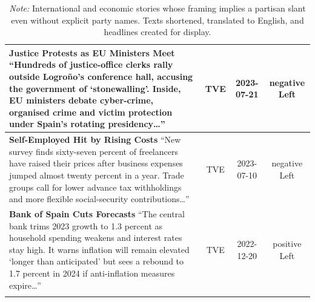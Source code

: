 \documentclass[12pt]{article}
\begin{document}
\begin{center}
\begin{longtable}{|p{8cm}|c|c|c|}
	\textbf{Justice Protests as EU Ministers Meet}\newline
	{\scriptsize“Hundreds of justice-office clerks rally outside Logroño’s conference hall, accusing the government of ‘stonewalling’.  Inside, EU ministers debate cyber-crime, organised crime and victim protection under Spain’s rotating presidency…”}
	& TVE & 2023-07-21 & negative Left\\
	\hline
	
	\textbf{Self-Employed Hit by Rising Costs}\newline
	{\scriptsize“New survey finds sixty-seven percent of freelancers have raised their prices after business expenses jumped almost twenty percent in a year.  Trade groups call for lower advance tax withholdings and more flexible social-security contributions…”}
	& TVE & 2023-07-10 & negative Left\\
	\hline
	
	\textbf{Bank of Spain Cuts Forecasts}\newline
	{\scriptsize“The central bank trims 2023 growth to 1.3 percent as household spending weakens and interest rates stay high.  It warns inflation will remain elevated ‘longer than anticipated’ but sees a rebound to 1.7 percent in 2024 if anti-inflation measures expire…”}
	& TVE & 2022-12-20 & positive Left\\
	\hline
	
	\caption*{\textit{Note:} International and economic stories whose framing implies a partisan slant even without explicit party names.  Texts shortened, translated to English, and headlines created for display.}
	\label{tab:international}
\end{longtable}
\label{tab:examples_stories}
\end{center}
\end{document}
